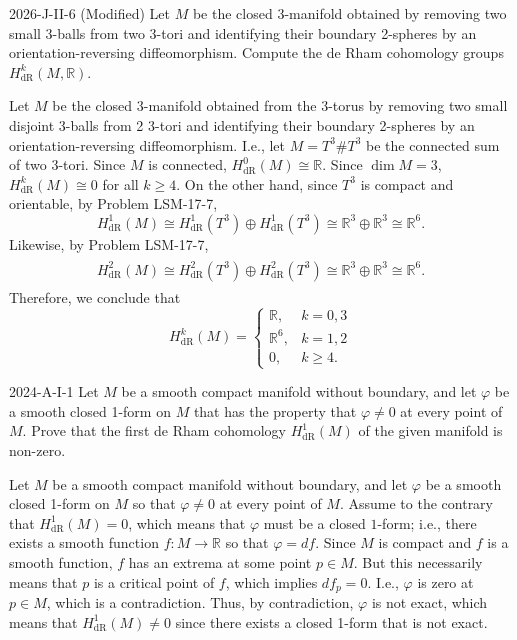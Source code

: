 \documentclass{article}
\begin{document}
	\begin{prb}{2026-J-II-6 (Modified)}
		Let $M$ be the closed 3-manifold obtained by removing two small 3-balls from two 3-tori and identifying their boundary 2-spheres by an orientation-reversing diffeomorphism. Compute the de Rham cohomology groups $H^{k}_{\text{dR}}(M, \mathbb{R})$. 
	\end{prb}
	Let $M$ be the closed 3-manifold obtained from the 3-torus by removing two small disjoint 3-balls from 2 3-tori and identifying their boundary 2-spheres by an orientation-reversing diffeomorphism. I.e., let $M = T^{3} \# T^{3}$ be the connected sum of two 3-tori. Since $M$ is connected, $H^{0}_{\text{dR}}(M) \cong \mathbb{R}$. Since $\dim{M} = 3$, $H^{k}_{\text{dR}}(M) \cong 0$ for all $k \geq 4$. On the other hand, since $T^{3}$ is compact and orientable, by Problem LSM-17-7,
	\begin{equation*}
		H^{1}_{\text{dR}}(M) \cong H^{1}_{\text{dR}}(T^{3}) \oplus H^{1}_{\text{dR}}(T^{3}) \cong \mathbb{R}^{3} \oplus \mathbb{R}^{3} \cong \mathbb{R}^{6}. 
	\end{equation*}
	Likewise, by Problem LSM-17-7, 
	\begin{align*}
		\begin{split}
			H^{2}_{\text{dR}}(M) \cong H^{2}_{\text{dR}}(T^{3}) \oplus H^{2}_{\text{dR}}(T^{3}) \cong \mathbb{R}^{3} \oplus \mathbb{R}^{3} \cong \mathbb{R}^{6}. 
		\end{split}
	\end{align*}
	Therefore, we conclude that 
	\begin{equation*}
		H^{k}_{\text{dR}}(M) = 
		\begin{cases}
			\mathbb{R}, & k = 0, 3 \\
			\mathbb{R}^{6}, & k = 1, 2 \\
			0, & k \geq 4.
		\end{cases}
	\end{equation*}
	
	
	\begin{prb}{2024-A-I-1}
		Let $M$ be a smooth compact manifold without boundary, and let $\varphi$ be a smooth closed 1-form on $M$ that has the property that $\varphi \neq 0$ at every point of $M$. Prove that the first de Rham cohomology $H^{1}_{\text{dR}}(M)$ of the given manifold is non-zero. 
	\end{prb}
	Let $M$ be a smooth compact manifold without boundary, and let $\varphi$ be a smooth closed 1-form on $M$ so that $\varphi \neq 0$ at every point of $M$. Assume to the contrary that $H^{1}_{\text{dR}}(M) = 0$, which means that $\varphi$ must be a closed $1$-form; i.e., there exists a smooth function $f: M \to \mathbb{R}$ so that $\varphi = df$. Since $M$ is compact and $f$ is a smooth function, $f$ has an extrema at some point $p \in M$. But this necessarily means that $p$ is a critical point of $f$, which implies $df_{p} = 0$. I.e., $\varphi$ is zero at $p \in M$, which is a contradiction. Thus, by contradiction, $\varphi$ is not exact, which means that $H^{1}_{\text{dR}}(M) \neq 0$ since there exists a closed 1-form that is not exact. 
	
\end{document}
